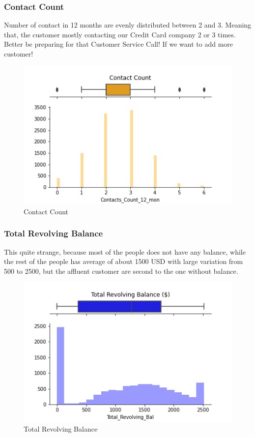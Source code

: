 \documentclass{homeworg}
\begin{document}
\subsubsection{Contact Count}
Number of contact in 12 months are evenly distributed between 2 and 3. Meaning that, the customer mostly contacting our Credit Card company 2 or 3 times. Better be preparing for that Customer Service Call! If we want to add more customer!
\begin{figure}[H]
    \centering
    \includegraphics[scale=0.7]{figure/HG_Contacts_count.jpg}
    \caption{Contact Count}
    \label{fig:contactcount}
\end{figure}
\par
\subsubsection{Total Revolving Balance}
This quite strange, because most of the people does not have any balance, while the rest of the people has average of about 1500 USD with large variation from 500 to 2500, but the affluent customer are second to the one without balance.
\begin{figure}[H]
    \centering
    \includegraphics[scale=0.7]{figure/HG_Total_rev_balance.jpg}
    \caption{Total Revolving Balance}
    \label{fig:revbal}
\end{figure}
\par
\end{document}
